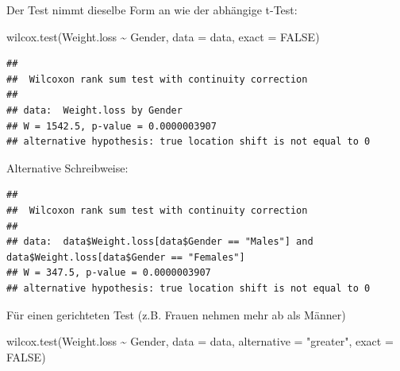 \documentclass[
]{book}
\newenvironment{Shaded}{\begin{snugshade}}{\end{snugshade}}
\newcommand{\AttributeTok}[1]{\textcolor[rgb]{0.77,0.63,0.00}{#1}}
\newcommand{\ConstantTok}[1]{\textcolor[rgb]{0.00,0.00,0.00}{#1}}
\newcommand{\FunctionTok}[1]{\textcolor[rgb]{0.00,0.00,0.00}{#1}}
\newcommand{\NormalTok}[1]{#1}
\newcommand{\SpecialCharTok}[1]{\textcolor[rgb]{0.00,0.00,0.00}{#1}}
\newcommand{\StringTok}[1]{\textcolor[rgb]{0.31,0.60,0.02}{#1}}
\begin{document}
Der Test nimmt dieselbe Form an wie der abhängige t-Test:

\begin{Shaded}
\begin{Highlighting}[]
\FunctionTok{wilcox.test}\NormalTok{(Weight.loss }\SpecialCharTok{\textasciitilde{}}\NormalTok{ Gender, }\AttributeTok{data =}\NormalTok{ data, }\AttributeTok{exact =} \ConstantTok{FALSE}\NormalTok{)}
\end{Highlighting}
\end{Shaded}

\begin{verbatim}
## 
##  Wilcoxon rank sum test with continuity correction
## 
## data:  Weight.loss by Gender
## W = 1542.5, p-value = 0.0000003907
## alternative hypothesis: true location shift is not equal to 0
\end{verbatim}

Alternative Schreibweise:

\begin{Shaded}
\end{Shaded}

\begin{verbatim}
## 
##  Wilcoxon rank sum test with continuity correction
## 
## data:  data$Weight.loss[data$Gender == "Males"] and data$Weight.loss[data$Gender == "Females"]
## W = 347.5, p-value = 0.0000003907
## alternative hypothesis: true location shift is not equal to 0
\end{verbatim}

Für einen gerichteten Test (z.B. Frauen nehmen mehr ab als Männer)

\begin{Shaded}
\begin{Highlighting}[]
\FunctionTok{wilcox.test}\NormalTok{(Weight.loss }\SpecialCharTok{\textasciitilde{}}\NormalTok{ Gender, }\AttributeTok{data =}\NormalTok{ data, }\AttributeTok{alternative =} \StringTok{"greater"}\NormalTok{, }\AttributeTok{exact =} \ConstantTok{FALSE}\NormalTok{)}
\end{Highlighting}
\end{Shaded}
\end{document}
